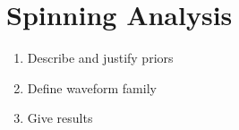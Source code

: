 \section{Spinning Analysis}

\begin{enumerate}
\item Describe and justify priors
\item Define waveform family
\item Give results
\end{enumerate}
